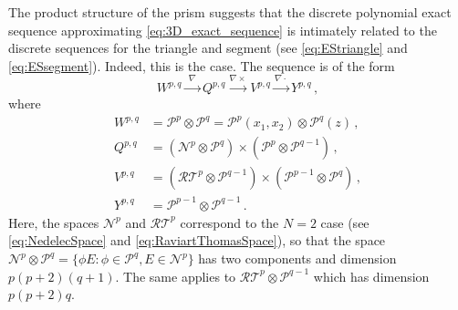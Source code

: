 %
The product structure of the prism suggests that the discrete polynomial exact sequence approximating \eqref{eq:3D_exact_sequence} is intimately related to the discrete sequences for the triangle and segment (see \eqref{eq:EStriangle} and \eqref{eq:ESsegment}).
Indeed, this is the case. 
The sequence is of the form
\begin{equation}
	W^{p,q} \xrightarrow{\,\,\nabla\,\,} Q^{p,q} \xrightarrow{\nabla\times} V^{p,q} \xrightarrow{\nabla\cdot} Y^{p,q} \,,
\end{equation}
where
\begin{equation}
	\begin{aligned}
	W^{p,q}&=\mathcal{P}^p\otimes\mathcal{P}^q=\mathcal{P}^p(x_1,x_2)\otimes\mathcal{P}^q(z)\,,\\
	Q^{p,q}&=(\mathcal{N}^p\otimes\mathcal{P}^q)\times(\mathcal{P}^p\otimes\mathcal{P}^{q-1})\,,\\
	V^{p,q}&=(\mathcal{RT}^p\otimes\mathcal{P}^{q-1})\times(\mathcal{P}^{p-1}\otimes\mathcal{P}^q)\,,\\
	Y^{p,q}&=\mathcal{P}^{p-1}\otimes\mathcal{P}^{q-1}\,.
	\end{aligned}
\end{equation}
Here, the spaces $\mathcal{N}^p$ and $\mathcal{RT}^p$ correspond to the $N=2$ case (see \eqref{eq:NedelecSpace} and	\eqref{eq:RaviartThomasSpace}), so that the space $\mathcal{N}^p\otimes\mathcal{P}^q=\{\phi E:\phi\in\mathcal{P}^q,E\in\mathcal{N}^p\}$ has two components and dimension $p(p+2)(q+1)$. The same applies to $\mathcal{RT}^p\otimes\mathcal{P}^{q-1}$ which has dimension $p(p+2)q$.



